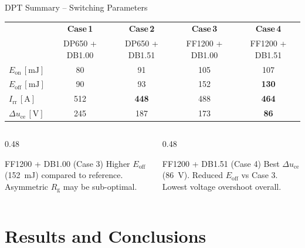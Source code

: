 \documentclass[aspectratio=169, 10pt]{beamer}
\newcommand{\good}[1]{\textcolor{goodgreen}{\textbf{#1}}}
\begin{document}
\begin{frame}{DPT Summary -- Switching Parameters}
  \centering
  \renewcommand{\arraystretch}{1.6}
  \begin{tabularx}{0.85\textwidth}{X c c c c}
    \toprule
    & \textbf{Case\,1} & \textbf{Case\,2} & \textbf{Case\,3} & \textbf{Case\,4} \\
    & DP650 + DB1.00 & DP650 + DB1.51 & FF1200 + DB1.00 & FF1200 + DB1.51 \\
    \midrule
    \rowcolor{rowgray}
    $E_\text{on}\,[\si{\milli\joule}]$         & 80  & 91  & 105 & 107 \\
    $E_\text{off}\,[\si{\milli\joule}]$        & 90  & 93  & 152 & \good{130} \\
    \rowcolor{rowgray}
    $I_\text{rr}\,[\si{\ampere}]$              & 512 & \good{448} & 488 & \good{464} \\
    $\Delta u_\text{ce}\,[\si{\volt}]$         & 245 & 187 & 173 & \good{86}  \\
    \bottomrule
  \end{tabularx}

  \vspace{10pt}
  \begin{columns}[T]
    \begin{column}{0.48\textwidth}
      \begin{alertblock}{FF1200 + DB1.00 (Case 3)}
        Higher $E_\text{off}$ (\SI{152}{\milli\joule}) compared to reference.
        Asymmetric $R_\text{g}$ may be sub-optimal.
      \end{alertblock}
    \end{column}
    \begin{column}{0.48\textwidth}
      \begin{exampleblock}{FF1200 + DB1.51 (Case 4)}
        Best $\Delta u_\text{ce}$ (\SI{86}{\volt}).
        Reduced $E_\text{off}$ vs Case 3.
        Lowest voltage overshoot overall.
      \end{exampleblock}
    \end{column}
  \end{columns}
\end{frame}

\section{Results and Conclusions}
\end{document}
